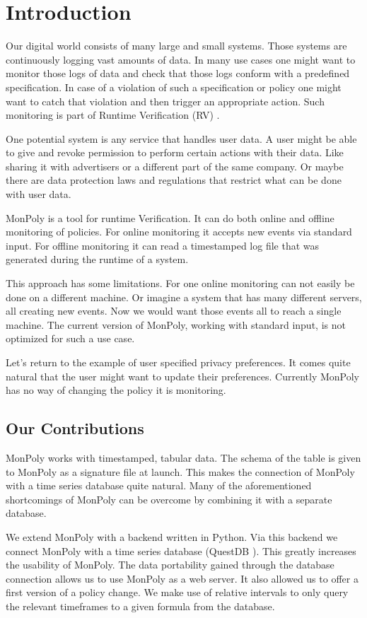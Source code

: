 \section{Introduction}

Our digital world consists of many large and small systems.
Those systems are continuously logging vast amounts of data.
In many use cases one might want to monitor those logs of data and check that those logs conform with a predefined specification.
In case of a violation of such a specification or policy one might want to catch that violation and then trigger an appropriate action.
Such monitoring is part of Runtime Verification (RV) \cite{Bartocci2018}.

One potential system is any service that handles user data.
A user might be able to give and revoke permission to perform certain actions with their data.
Like sharing it with advertisers or a different part of the same company.
Or maybe there are data protection laws and regulations that restrict what can be done with user data.

MonPoly \cite{Basin2017} is a tool for runtime Verification.
It can do both online and offline monitoring of policies.
For online monitoring it accepts new events via standard input.
For offline monitoring it can read a timestamped log file that was generated during the runtime of a system.

This approach has some limitations. For one online monitoring can not easily be done on a different machine.
Or imagine a system that has many different servers, all creating new events.
Now we would want those events all to reach a single machine.
The current version of MonPoly, working with standard input, is not optimized for such a use case.

Let's return to the example of user specified privacy preferences.
It comes quite natural that the user might want to update their preferences.
Currently MonPoly has no way of changing the policy it is monitoring.

\subsection{Our Contributions}
MonPoly works with timestamped, tabular data.
The schema of the table is given to MonPoly as a signature file at launch.
This makes the connection of MonPoly with a time series database quite natural.
Many of the aforementioned shortcomings of MonPoly can be overcome by combining it with a separate database.

We extend MonPoly with a backend written in Python.
Via this backend we connect MonPoly with a time series database (QuestDB \cite{questdb}).
This greatly increases the usability of MonPoly.
The data portability gained through the database connection allows us to use MonPoly as a web server.
It also allowed us to offer a first version of a policy change.
We make use of relative intervals to only query the relevant timeframes to a given formula from the database.



